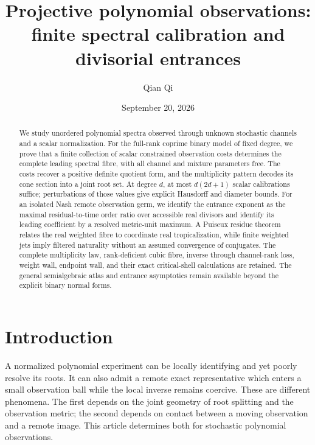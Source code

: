 
\title[Finite spectral calibration and divisorial entrances]{Projective polynomial observations:\\ finite spectral calibration and divisorial entrances}
\author{Qian Qi}
\date{September 20, 2026}

\begin{abstract}
We study unordered polynomial spectra observed through unknown stochastic
channels and a scalar normalization. For the full-rank coprime binary
model of fixed degree, we prove that a finite collection of scalar
constrained observation costs determines the complete leading spectral
fibre, with all channel and mixture parameters free. The costs recover
a positive definite quotient form, and the multiplicity pattern decodes
its cone section into a joint root set. At degree $d$, at most
$d(2d+1)$ scalar calibrations suffice; perturbations of those values give
explicit Hausdorff and diameter bounds. For an isolated Nash remote
observation germ, we identify the entrance exponent as the maximal
residual-to-time order ratio over accessible real divisors and identify
its leading coefficient by a resolved metric-unit maximum. A Puiseux
residue theorem relates the real weighted fibre to coordinate real
tropicalization, while finite weighted jets imply filtered naturality
without an assumed convergence of conjugates. The complete multiplicity
law, rank-deficient cubic fibre, inverse through channel-rank loss,
weight wall, endpoint wall, and their exact critical-shell calculations
are retained. The general semialgebraic atlas and entrance asymptotics
remain available beyond the explicit binary normal forms.
\end{abstract}
\maketitle

\section{Introduction}
A normalized polynomial experiment can be locally identifying and yet
poorly resolve its roots. It can also admit a remote exact representative
which enters a small observation ball while the local inverse remains
coercive. These are different phenomena. The first depends on the joint
geometry of root splitting and the observation metric; the second
depends on contact between a moving observation and a remote image.
This article determines both for stochastic polynomial observations.

